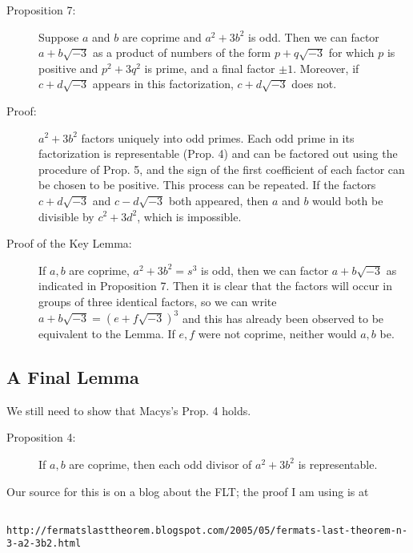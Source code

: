 \documentclass[12pt]{article}
\begin{document}
\begin{description}
\item[Proposition 7:]  Suppose $a$ and $b$ are coprime and $a^2+3b^2$ is odd.  Then we can factor $a+b\sqrt{-3}$ 
as a product of numbers of the form $p+q\sqrt{-3}$ for which $p$ is positive and $p^2+3q^2$ is prime, and a final factor $\pm 1$.
Moreover, if $c+d\sqrt{-3}$ appears in this factorization, $c+d\sqrt{-3}$ does not.

\item[Proof:]  $a^2+3b^2$ factors uniquely into odd primes.  Each odd prime in its factorization is representable (Prop. 4) and can be
factored out using the procedure of Prop. 5, and the sign of the first coefficient of each factor can be chosen to be positive.  This process can be repeated.  If the factors $c + d\sqrt{-3}$ and $c-d\sqrt{-3}$ both appeared, then $a$ and $b$ would both be divisible by $c^2+3d^2$, which is impossible.

\item[Proof of the Key Lemma:]  If $a,b$ are coprime, $a^2+3b^2=s^3$ is odd, then we can factor $a+b\sqrt{-3}$ as indicated in
Proposition 7.  Then it is clear that the factors will occur in groups of three identical factors, so we can write $a+b\sqrt{-3}=(e+f\sqrt{-3})^3$
and this has already been observed to be equivalent to the Lemma.  If $e,f$ were not coprime, neither would $a,b$ be.

\end{description}


\subsection{A Final Lemma}

We still need to show that Macys's Prop. 4 holds.

\begin{description}

\item[Proposition 4:]  If $a,b$ are coprime, then each odd divisor of $a^2+3b^2$ is representable.

\end{description}

Our source for this is on a blog about the FLT; the proof I am using is at
{\small
\begin{verbatim}

http://fermatslasttheorem.blogspot.com/2005/05/fermats-last-theorem-n-3-a2-3b2.html

\end{verbatim}}
\end{document}
